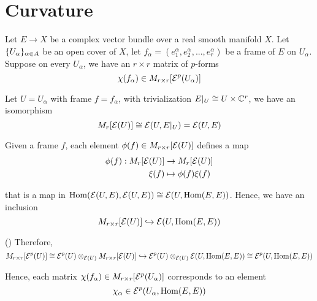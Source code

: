 \section{Curvature}

\begin{remark}
	Let $E \to X$ be a complex vector bundle over a real smooth manifold $X$. Let $\{U_\alpha\}_{\alpha \in A}$ be an open cover of $X$, let $f_\alpha = (e^\alpha_1, e^\alpha_2, ..., e^\alpha_r)$ be a frame of $E$ on $U_\alpha$. Suppose on every $U_\alpha$, we have an $r \times r$ matrix of $p$-forms
	$$
		\chi(f_\alpha) \in M_{r \times r}[\mathcal{E}^p(U_\alpha)]
	$$
	
	Let $U = U_\alpha$ with frame $f = f_\alpha$, with trivialization $E\vert_U \cong U \times \mathbb{C}^r$, we have an isomorphism
	$$
		M_r[\mathcal{E}(U)] \cong \mathcal{E}(U, E\vert_U) = \mathcal{E}(U, E)
	$$
	
	Given a frame $f$, each element $\phi(f) \in M_{r \times r}[\mathcal{E}(U)]$ defines a map
	\begin{align*}
		\phi(f): M_r[\mathcal{E}(U)] &\to M_r[\mathcal{E}(U)] \\
				\xi(f) &\mapsto \phi(f) \xi(f)
	\end{align*}
	
	 that is a map in $\operatorname{Hom}(\mathcal{E}(U, E), \mathcal{E}(U, E)) \cong \mathcal{E}(U, \operatorname{Hom}(E, E))$. Hence, we have an inclusion
	$$
		M_{r \times r}[\mathcal{E}(U)] \hookrightarrow \mathcal{E}(U, \operatorname{Hom}(E, E))
	$$
	
	() Therefore, 
	$$
		M_{r \times r}[\mathcal{E}^p(U)] \cong \mathcal{E}^p(U) \otimes_{\mathcal{E}(U)} M_{r \times r}[\mathcal{E}(U)] \hookrightarrow \mathcal{E}^p(U) \otimes_{\mathcal{E}(U)} \mathcal{E}(U, \operatorname{Hom}(E, E)) \cong \mathcal{E}^p(U, \operatorname{Hom}(E, E))
	$$
	
	Hence, each matrix $\chi(f_\alpha) \in M_{r \times r}[\mathcal{E}^p(U_\alpha)]$ corresponds to an element
	$$
		\chi_\alpha \in \mathcal{E}^p(U_\alpha, \operatorname{Hom}(E, E))
	$$
\end{remark}

